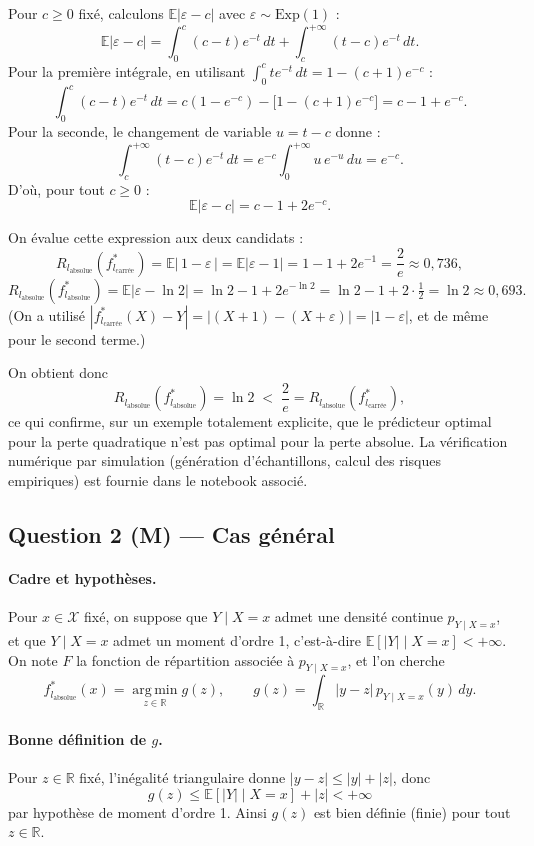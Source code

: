 \documentclass[11pt]{article}
\theoremstyle{remark}
\newcommand{\X}{\mathcal{X}}
\newcommand{\E}{\mathbb{E}}
\newcommand{\R}{\mathbb{R}}
\begin{document}
Pour $c \geq 0$ fixé, calculons $\E|\varepsilon - c|$ avec $\varepsilon \sim \mathrm{Exp}(1)$ :
\[
  \E|\varepsilon - c| = \int_0^c (c-t)e^{-t}\,dt + \int_c^{+\infty}(t-c)e^{-t}\,dt.
\]
Pour la première intégrale, en utilisant $\int_0^c t e^{-t}\,dt = 1-(c+1)e^{-c}$ :
\[
  \int_0^c (c-t)e^{-t}\,dt = c(1-e^{-c}) - \big[1-(c+1)e^{-c}\big] = c - 1 + e^{-c}.
\]
Pour la seconde, le changement de variable $u = t-c$ donne :
\[
  \int_c^{+\infty}(t-c)e^{-t}\,dt = e^{-c}\int_0^{+\infty} u\,e^{-u}\,du = e^{-c}.
\]
D'où, pour tout $c \geq 0$ :
\[
  \E|\varepsilon - c| = c - 1 + 2e^{-c}.
\]

On évalue cette expression aux deux candidats :
\[
  R_{l_{\text{absolue}}}(f^*_{l_{\text{carrée}}}) = \E\big|\,1 - \varepsilon\,\big| = \E|\varepsilon - 1| = 1 - 1 + 2e^{-1} = \frac{2}{e} \approx 0{,}736,
\]
\[
  R_{l_{\text{absolue}}}(f^*_{l_{\text{absolue}}}) = \E|\varepsilon - \ln 2| = \ln 2 - 1 + 2e^{-\ln 2} = \ln 2 - 1 + 2\cdot\tfrac12 = \ln 2 \approx 0{,}693.
\]
(On a utilisé $|f^*_{l_{\text{carrée}}}(X) - Y| = |(X+1)-(X+\varepsilon)| = |1-\varepsilon|$, et de même pour le second terme.)

On obtient donc
\[
  \boxed{R_{l_{\text{absolue}}}(f^*_{l_{\text{absolue}}}) = \ln 2 \;<\; \frac{2}{e} = R_{l_{\text{absolue}}}(f^*_{l_{\text{carrée}}})},
\]
ce qui confirme, sur un exemple totalement explicite, que le prédicteur optimal pour la perte quadratique n'est pas optimal pour la perte absolue. La vérification numérique par simulation (génération d'échantillons, calcul des risques empiriques) est fournie dans le notebook associé.

\subsection*{Question 2 (M) --- Cas général}

\paragraph{Cadre et hypothèses.}
Pour $x \in \X$ fixé, on suppose que $Y \mid X=x$ admet une densité continue $p_{Y\mid X=x}$, et que $Y\mid X=x$ admet un moment d'ordre 1, c'est-à-dire $\E[|Y| \mid X=x] < +\infty$. On note $F$ la fonction de répartition associée à $p_{Y\mid X=x}$, et l'on cherche
\[
  f^*_{l_{\text{absolue}}}(x) = \operatorname*{arg\,min}_{z \in \R} g(z), \qquad g(z) = \int_{\R} |y-z|\, p_{Y\mid X=x}(y)\,dy.
\]

\paragraph{Bonne définition de $g$.}
Pour $z \in \R$ fixé, l'inégalité triangulaire donne $|y-z| \leq |y| + |z|$, donc
\[
  g(z) \leq \E[|Y| \mid X=x] + |z| < +\infty
\]
par hypothèse de moment d'ordre 1. Ainsi $g(z)$ est bien définie (finie) pour tout $z \in \R$.
\end{document}
